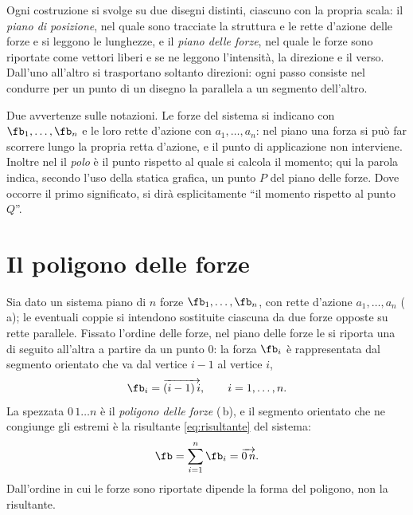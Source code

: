Ogni costruzione si svolge su due disegni distinti, ciascuno con la propria scala: il \emph{piano
di posizione}, nel quale sono tracciate la struttura e le rette d'azione delle forze e si leggono
le lunghezze, e il \emph{piano delle forze}, nel quale le forze sono riportate come vettori liberi
e se ne leggono l'intensità, la direzione e il verso. Dall'uno all'altro si trasportano soltanto
direzioni: ogni passo consiste nel condurre per un punto di un disegno la parallela a un segmento
dell'altro.

Due avvertenze sulle notazioni. Le forze del sistema si indicano con $\fb_1, \dots, \fb_n$ e le
loro rette d'azione con $a_1, \dots, a_n$: nel piano una forza si può far scorrere lungo la propria
retta d'azione, e il punto di applicazione non interviene. Inoltre nel
 il \emph{polo} è il punto rispetto al quale si calcola il momento; qui la
parola indica, secondo l'uso della statica grafica, un punto $P$ del piano delle forze. Dove
occorre il primo significato, si dirà esplicitamente ``il momento rispetto al punto $Q$''.

\section{Il poligono delle forze}
\label{sec:poligono_forze_sgr}

Sia dato un sistema piano di $n$ forze $\fb_1, \dots, \fb_n$, con rette d'azione
$a_1, \dots, a_n$ (\,a); le eventuali coppie si intendono sostituite
ciascuna da due forze opposte su rette parallele. Fissato l'ordine delle forze, nel piano delle
forze le si riporta una di seguito all'altra a partire da un punto $0$: la forza $\fb_i$ è
rappresentata dal segmento orientato che va dal vertice $i-1$ al vertice $i$,
\begin{equation}
	\fb_i = \overrightarrow{(i-1)\,i}, \qquad i = 1, \dots, n .
	\label{eq:lati_poligono_forze_sgr}
\end{equation}
La spezzata $0\,1 \dots n$ è il \emph{poligono delle forze} (\,b), e
il segmento orientato che ne congiunge gli estremi è la risultante \eqref{eq:risultante} del
sistema:
\begin{equation}
	\fb = \sum_{i=1}^{n} \fb_i = \overrightarrow{0\,n} .
	\label{eq:risultante_sgr}
\end{equation}
Dall'ordine in cui le forze sono riportate dipende la forma del poligono, non la risultante.

